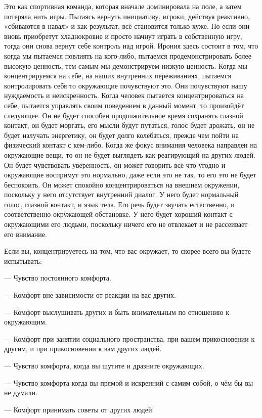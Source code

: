 Это как спортивная команда, которая вначале доминировала на поле, а затем потеряла нить игры. Пытаясь вернуть инициативу, игроки, действуя реактивно, «сбиваются в навал» и как результат, всё становится только хуже. Но если они вновь приобретут хладнокровие и просто начнут играть в собственную игру, тогда они снова вернут себе контроль над игрой. Ирония здесь состоит в том, что когда мы пытаемся повлиять на кого-либо, пытаемся продемонстрировать более высокую ценность, тем самым мы демонстрируем низкую ценность. Когда мы концентрируемся на себе, на наших внутренних переживаниях, пытаемся контролировать себя то окружающие почувствуют это. Они почувствуют нашу нуждаемость и неискренность. Когда человек пытается концентрироваться на себе, пытается управлять своим поведением в данный момент, то произойдёт следующее. Он не будет способен продолжительное время сохранять глазной контакт, он будет моргать, его мысли будут путаться, голос будет дрожать, он не будет излучать энергетику, он будет долго колебаться, прежде чем пойти на физический контакт с кем-либо. Когда же фокус внимания человека направлен на окружающие вещи, то он не будет выглядеть как реагирующий на других людей. Он будет чувствовать уверенность, он может говорить всё что угодно и окружающие воспримут это нормально, даже если это не так, то его это не будет беспокоить. Он может спокойно концентрироваться на внешнем окружении, поскольку у него отсутствует внутренний диалог. У него будет нормальный голос, глазной контакт, и язык тела. Его речь будет звучать естественно, и соответственно окружающей обстановке. У него будет хороший контакт с окружающими его людьми, поскольку ничего его не отвлекает и не рассеивает его внимание.

Если вы, концентрируетесь на том, что вас окружает, то скорее всего вы будете испытывать:

--- Чувство постоянного комфорта.

--- Комфорт вне зависимости от реакции на вас других.

--- Комфорт выслушивать других и быть внимательным по отношению к окружающим.

--- Комфорт при занятии социального пространства, при вашем прикосновении к другим, и при прикосновении к вам других людей.

--- Чувство комфорта, когда вы шутите и дразните окружающих.

--- Чувство комфорта когда вы прямой и искренний с самим собой, о чём бы вы не думали.

--- Комфорт принимать советы от других людей.


